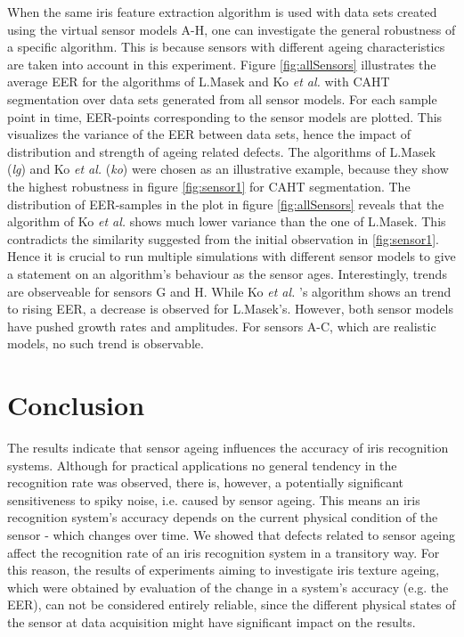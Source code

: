 \documentclass[10pt,twocolumn,letterpaper]{article}
\providecommand{\etal}[0]{\textit{et al.} }
\begin{document}
 When the same iris feature extraction algorithm is used with data sets created using the virtual sensor models A-H, one can investigate the general robustness of a specific algorithm. This is because sensors with different ageing characteristics are taken into account in this experiment. Figure \ref{fig:allSensors} illustrates the average EER for the algorithms of L.Masek and Ko \etal with CAHT segmentation over data sets generated from all sensor models. For each sample point in time, EER-points corresponding to the sensor models are plotted. This visualizes the variance of the EER between data sets, hence the impact of distribution and strength of ageing related defects. The algorithms of L.Masek (\emph{lg}) and Ko \etal (\emph{ko}) were chosen as an illustrative example, because they show the highest robustness in figure \ref{fig:sensor1} for CAHT segmentation. The distribution of EER-samples in the plot in figure \ref{fig:allSensors} reveals that the algorithm of Ko \etal shows much lower variance than the one of L.Masek. This contradicts the similarity suggested from the initial observation in \ref{fig:sensor1}. Hence it is crucial to run multiple simulations with different sensor models to give a statement on an algorithm's behaviour as the sensor ages. Interestingly, trends are observeable for sensors G and H. While Ko \etal's algorithm shows an trend to rising EER, a decrease is observed for L.Masek's. However, both sensor models have pushed growth rates and amplitudes. For sensors A-C, which are realistic models, no such trend is observable.
 
 \section{Conclusion}
 \label{conclusion}
 
The results indicate that sensor ageing influences the accuracy of iris recognition systems. Although for practical applications no general tendency in the recognition rate was observed, there is, however, a potentially significant sensitiveness to spiky noise, i.e. caused by sensor ageing. This means an iris recognition system's accuracy depends on the current physical condition of the sensor - which changes over time. We showed that defects related to sensor ageing affect the recognition rate of an iris recognition system in a transitory way. For this reason, the results of experiments aiming to investigate iris texture ageing, which were obtained by evaluation of the change in a system's accuracy (e.g. the EER), can not be considered entirely reliable, since the different physical states of the sensor at data acquisition might have significant impact on the results.  
 
\end{document}

